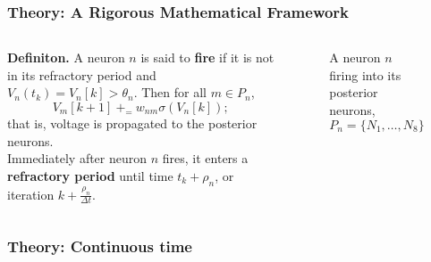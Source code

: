 \documentclass{beamer}
\newcommand*{\Scale}[2][4]{\scalebox{#1}{$#2$}}%
\begin{document}
    \begin{frame}
    \frametitle{Theory: A Rigorous Mathematical Framework} 

    \begin{columns}
      \begin{column}{0.7\textwidth}
\textbf{Definiton. }
  A neuron $n$ is said to \textbf{fire} if it is not in its refractory period and $V_n(t_{k}) = V_n[k] > \theta_n$. Then for all $m \in P_n$,
  \begin{equation*}
    V_m[k+1] {\ +_=\ } w_{nm} \sigma(V_n[k]); \label{eq:fire}
  \end{equation*}
  that is, voltage is propagated to the posterior neurons.  \\[0.5cm]

  Immediately after neuron $n$ fires, it enters  a \textbf{refractory period} until time $t_{k} + \rho_n$, or iteration $k + \frac{\rho_n}{\Delta t}$. 

      \end{column}
      \begin{column}{0.3\textwidth}
      \begin{figure}
          \begin{centering}

          \end{centering}
          \caption{A neuron $n$ firing  into its posterior neurons, $P_n = \{N_1, \dots, N_8\}$}
      \end{figure}
      
      \end{column}
    \end{columns}
    \end{frame}

       \begin{frame}
    \frametitle{Theory: Continuous time }
    \end{frame}
\end{document}

